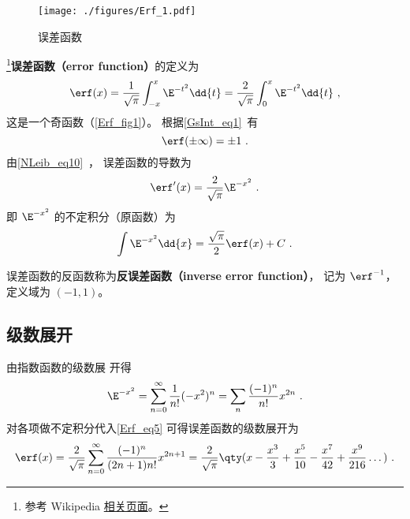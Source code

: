 

\begin{figure}[ht]
\centering
\texttt{[image: ./figures/Erf\_1.pdf]}
\caption{误差函数} \label{Erf_fig1}
\end{figure}

\footnote{参考 Wikipedia \href{https://en.wikipedia.org/wiki/Error_function}{相关页面}。}\textbf{误差函数（error function）}的定义为
\begin{equation}\label{Erf_eq1}
\erf(x) = \frac{1}{\sqrt{\pi}} \int_{-x}^x \E^{-t^2} \dd{t}
= \frac{2}{\sqrt{\pi}} \int_{0}^x \E^{-t^2} \dd{t}~,
\end{equation}
这是一个奇函数（\autoref{Erf_fig1}）。 根据\autoref{GsInt_eq1}~有
\begin{equation}
\erf(\pm\infty) = \pm 1~.
\end{equation}
由\autoref{NLeib_eq10}~， 误差函数的导数为
\begin{equation} %
\erf'(x) = \frac{2}{\sqrt{\pi}} \E^{-x^2}~.
\end{equation}
即 $\E^{-x^2}$ 的不定积分（原函数）为
\begin{equation}\label{Erf_eq5}
\int \E^{-x^2} \dd{x} = \frac{\sqrt{\pi}}{2} \erf(x) + C~.
\end{equation}

误差函数的反函数称为\textbf{反误差函数（inverse error function）}， 记为 $\erf^{-1}$， 定义域为 $(-1,1)$。

\subsection{级数展开}
由指数函数的级数展%
开得
\begin{equation}
\E^{-x^2} = \sum_{n=0}^\infty \frac{1}{n!} (-x^2)^n = \sum_n \frac{(-1)^n}{n!} x^{2n}~.
\end{equation}
对各项做不定积分代入\autoref{Erf_eq5} 可得误差函数的级数展开为
\begin{equation}
\erf(x) = \frac{2}{\sqrt{\pi}} \sum_{n=0}^\infty \frac{(-1)^n}{(2n+1)n!} x^{2n+1}
= \frac{2}{\sqrt{\pi}}\qty(x - \frac{x^3}{3} + \frac{x^5}{10} - \frac{x^7}{42} + \frac{x^9}{216} \dots)~.
\end{equation}

